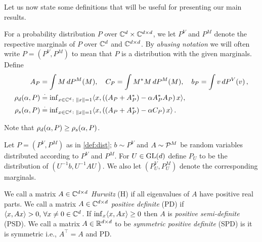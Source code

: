 Let us now state some definitions that will be useful for presenting our main results. 
\begin{definition}\label{def:dist}
For a probability distribution $P$ over $\C^d \times \C^{d\times d}$, we let $P^V$ and $P^M$ 
denote the respective marginals of $P$ over $\C^d$ and $\C^{d\times d}$. 
By \emph{abusing notation} we will often write $P = (P^V,P^M)$ to mean that $P$ is a distribution with the given marginals.
Define
\begin{align*}
A_P&=\int M\, dP^M(M),\quad C_P=\int M^* M \,dP^M(M), \quad b_P=\int v\, dP^V(v)\,,\\
\rhod{P}&\eqdef {\inf}_{x\in\C^d\colon\norm{x}=1}\ip{x,\left((A_P+A_P^*)-\alpha A_P^* A_P\right)x},\\ \rhos{P}&\eqdef{\inf}_{x\in \C^d\colon\norm{x}=1}\ip{x,\left((A_P+A_P^*)-\alpha C_P\right)x}\,.
\end{align*}
\end{definition}
Note that $\rhod{P}\ge \rhos{P}$.   
\begin{definition}\label{def:simdist}
Let $P=(P^V,P^M)$ as in \cref{def:dist}; $b\sim P^V$ and $A\sim \P^M$ be random variables distributed according to $P^V$ and $P^M$. For $U\in \gld$ define $P_U$ to be the  distribution of $(U^{-1}b,U^{-1}AU)$. We also let
$(P_U^V,P_U^M)$ denote the corresponding marginals. 
\end{definition}
\begin{definition}
We call a matrix $A\in \C^{\dcd}$  \emph{Hurwitz} (H) if all eigenvalues of $A$ have positive real parts. We call a matrix $A\in \C^{\dcd}$ \emph{positive definite} (PD) if $\ip{x,Ax} >0,\,\forall x\neq 0 \in \C^{d}$.  
If $\inf_x \ip{x,Ax}\ge 0$ then $A$ is \emph{positive semi-definite} (PSD).
We call a matrix $A\in \R^{\dcd}$ to be \emph{symmetric positive definite} (SPD) is it is symmetric i.e., $A^\top=A$ and PD. 
\end{definition}
